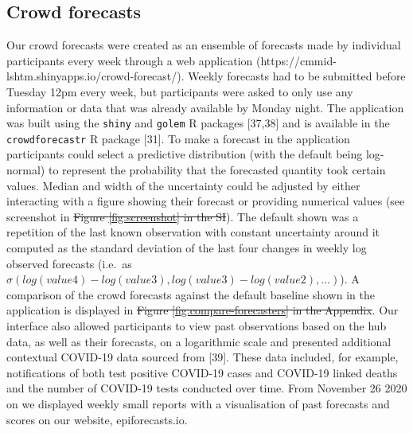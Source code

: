 \documentclass[10pt,letterpaper]{article}
\providecommand{\DIFdeltex}[1]{{\protect\color{red}\sout{#1}}}                      %
\providecommand{\DIFaddbegin}{} %
\providecommand{\DIFaddend}{} %
\providecommand{\DIFdelbegin}{} %
\providecommand{\DIFdelend}{} %
\providecommand{\DIFdel}[1]{\texorpdfstring{\DIFdeltex{#1}}{}} %
\newcommand{\DIFscaledelfig}{0.5}
\newlength{\DIFdelgraphicswidth} %
\newlength{\DIFdelgraphicsheight} %
\newcommand{\DIFaddincludegraphics}[2][]{{\color{blue}\fbox{\DIFOincludegraphics[#1]{#2}}}} %
\newcommand{\DIFdelincludegraphics}[2][]{%
\sbox{\DIFdelgraphicsbox}{\DIFOincludegraphics[#1]{#2}}%
\settoboxwidth{\DIFdelgraphicswidth}{\DIFdelgraphicsbox} %
\settoboxtotalheight{\DIFdelgraphicsheight}{\DIFdelgraphicsbox} %
\scalebox{\DIFscaledelfig}{%
\parbox[b]{\DIFdelgraphicswidth}{\usebox{\DIFdelgraphicsbox}\\[-\baselineskip] \rule{\DIFdelgraphicswidth}{0em}}\llap{\resizebox{\DIFdelgraphicswidth}{\DIFdelgraphicsheight}{%
\setlength{\unitlength}{\DIFdelgraphicswidth}%
\begin{picture}(1,1)%
\thicklines\linethickness{2pt} %
{\color[rgb]{1,0,0}\put(0,0){\framebox(1,1){}}}%
{\color[rgb]{1,0,0}\put(0,0){\line( 1,1){1}}}%
{\color[rgb]{1,0,0}\put(0,1){\line(1,-1){1}}}%
\end{picture}%
}\hspace*{3pt}}} %
} %
\DeclareRobustCommand{\DIFaddbegin}{\DIFOaddbegin \let\includegraphics\DIFaddincludegraphics} %
\DeclareRobustCommand{\DIFaddend}{\DIFOaddend \let\includegraphics\DIFOincludegraphics} %
\DeclareRobustCommand{\DIFdelbegin}{\DIFOdelbegin \let\includegraphics\DIFdelincludegraphics} %
\DeclareRobustCommand{\DIFdelend}{\DIFOaddend \let\includegraphics\DIFOincludegraphics} %
\begin{document}
\hypertarget{crowd-forecasts}{%
\subsection{Crowd forecasts}\label{crowd-forecasts}}

Our crowd forecasts were created as an ensemble of forecasts made by
individual participants every week through a web application
(https://cmmid-lshtm.shinyapps.io/crowd-forecast/). Weekly forecasts had
to be submitted before Tuesday 12pm every week, but participants were
asked to only use any information or data that was already available by
Monday night. The application was built using the \texttt{shiny} and
\texttt{golem} R packages {[}37,38{]} and is available in the
\texttt{crowdforecastr} R package {[}31{]}. To make a forecast in the
application participants could select a predictive distribution (with
the default being log-normal) to represent the probability that the
forecasted quantity took certain values. Median and width of the
uncertainty could be adjusted by either interacting with a figure
showing their forecast or providing numerical values (see screenshot in
\DIFdelbegin \DIFdel{Figure \ref{fig:screenshot} in the SI}\DIFdelend \DIFaddbegin {}\DIFaddend ). The default shown was a repetition of the
last known observation with constant uncertainty around it computed as
the standard deviation of the last four changes in weekly log observed
forecasts (i.e.~as
\(\sigma(log(value4) - log(value3), log(value3) - log(value2), \ldots )\)).
A comparison of the crowd forecasts against the default baseline shown
in the application is displayed in \DIFdelbegin \DIFdel{Figure \ref{fig:compare-forecasters}
in the Appendix}\DIFdelend \DIFaddbegin {}\DIFaddend .
Our interface also allowed participants to view past observations based
on the hub data, as well as their forecasts, on a logarithmic scale and
presented additional contextual COVID-19 data sourced from {[}39{]}.
These data included, for example, notifications of both test positive
COVID-19 cases and COVID-19 linked deaths and the number of COVID-19
tests conducted over time. From November 26 2020 on we displayed weekly
small reports with a visualisation of past forecasts and scores on our
website, epiforecasts.io.
\end{document}
